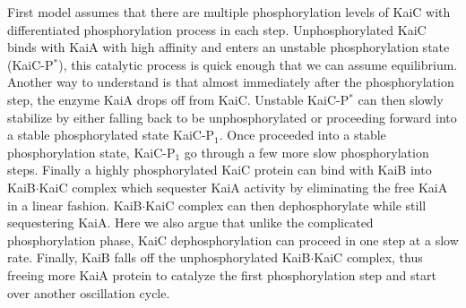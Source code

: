 \documentclass[a4paper,10pt]{article}
\numberwithin{equation}{section}
\begin{document}
First model assumes that there are multiple phosphorylation levels of KaiC with differentiated phosphorylation process in each step. Unphosphorylated KaiC binds with KaiA with high affinity and enters an unstable phosphorylation state (KaiC-P$^{*}$), this catalytic process is quick enough that we can assume equilibrium. Another way to understand is that almost immediately after the phosphorylation step, the enzyme KaiA drops off from KaiC. 
Unstable KaiC-P$^{*}$ can then slowly stabilize by either falling back to be unphosphorylated or proceeding forward into a stable phosphorylated state KaiC-P$_{1}$. Once proceeded into a stable phosphorylation state, KaiC-P$_{1}$ go through a few more slow phosphorylation steps. Finally a highly phosphorylated KaiC protein can bind with KaiB into KaiB$\cdot$KaiC complex which sequester KaiA activity by eliminating the free KaiA in a linear fashion. KaiB$\cdot$KaiC complex can then dephosphorylate while still sequestering KaiA. Here we also argue that unlike the complicated phosphorylation phase, KaiC dephosphorylation can proceed in one step at a slow rate. Finally, KaiB falls off the unphosphorylated KaiB$\cdot$KaiC complex, thus freeing more KaiA protein to catalyze the first phosphorylation step and start over another oscillation cycle. 


                                                                                               
\end{document}
